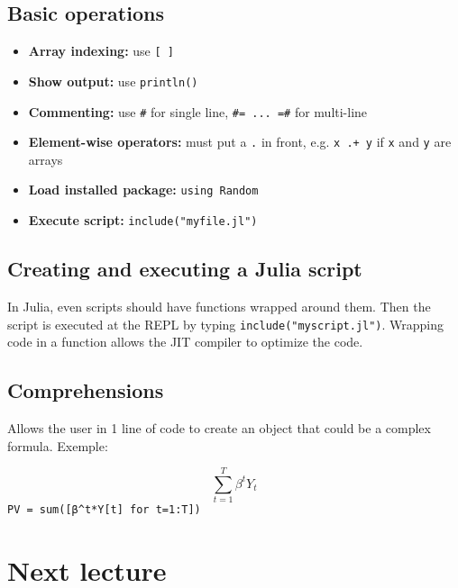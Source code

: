 \documentclass[11pt]{article}
\begin{document}
\subsection{Basic operations}
\label{sec:org25a760f}

\begin{itemize}
\item \textbf{Array indexing:} use \texttt{[ ]}
\item \textbf{Show output:} use \texttt{println()}
\item \textbf{Commenting:} use \texttt{\#} for single line, \texttt{\#= ... =\#} for multi-line
\item \textbf{Element-wise operators:} must put a \texttt{.} in front, e.g. \texttt{x .+ y} if \texttt{x} and \texttt{y} are arrays
\item \textbf{Load installed package:} \texttt{using Random}
\item \textbf{Execute script:} \texttt{include("myfile.jl")}
\end{itemize}

\subsection{Creating and executing a Julia script}
\label{sec:orga1c6d0a}

In Julia, even scripts should have functions wrapped around them. Then the script is executed at the REPL by typing \texttt{include("myscript.jl")}. Wrapping code in a function allows the JIT compiler to optimize the code.

\subsection{Comprehensions}
\label{sec:org77bd312}

Allows the user in 1 line of code to create an object that could be a complex formula. Exemple:

$$
\sum^T_{t=1} \beta^tY_t
$$
\texttt{PV = sum([β\textasciicircum{}t*Y[t] for t=1:T])}

\section{Next lecture}
\label{sec:orgb1158e5}
\end{document}
